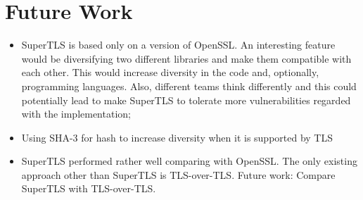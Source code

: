 \documentclass{sig-alternate-05-2015}
\begin{document}
\section{Future Work}

\begin{itemize}
\item{SuperTLS is based only on a version of OpenSSL. An interesting feature would be diversifying two different libraries and make them compatible with each other. This would increase diversity in the code and, optionally, programming languages. Also, different teams think differently and this could potentially lead to make SuperTLS to tolerate more vulnerabilities regarded with the implementation;}
\item{Using SHA-3 for hash to increase diversity when it is supported by TLS}
\item{SuperTLS performed rather well comparing with OpenSSL. The only existing approach other than SuperTLS is TLS-over-TLS. Future work: Compare SuperTLS with TLS-over-TLS.}
\end{itemize}

%

%
%
\end{document}
